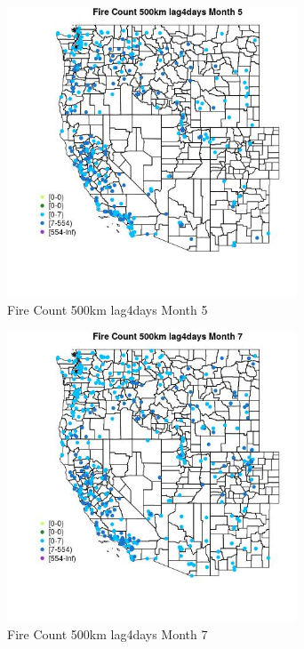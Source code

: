 \begin{figure} 
\centering  
\includegraphics[width=0.77\textwidth]{Code_Outputs/Report_ML_input_PM25_Step4_part_e_de_duplicated_aves_compiled_2019-05-18wNAs_MapObsMo5Fire_Count_500km_lag4days.jpg} 
\caption{\label{fig:Report_ML_input_PM25_Step4_part_e_de_duplicated_aves_compiled_2019-05-18wNAsMapObsMo5Fire_Count_500km_lag4days}Fire Count 500km lag4days Month 5} 
\end{figure} 
 

\begin{figure} 
\centering  
\includegraphics[width=0.77\textwidth]{Code_Outputs/Report_ML_input_PM25_Step4_part_e_de_duplicated_aves_compiled_2019-05-18wNAs_MapObsMo7Fire_Count_500km_lag4days.jpg} 
\caption{\label{fig:Report_ML_input_PM25_Step4_part_e_de_duplicated_aves_compiled_2019-05-18wNAsMapObsMo7Fire_Count_500km_lag4days}Fire Count 500km lag4days Month 7} 
\end{figure} 
 

